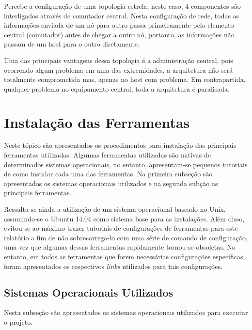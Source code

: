 		Percebe a configuração de uma topologia estrela, neste caso, 4 componentes são interligados através de comutador central. Nesta configuração de rede, todas as informações enviada de um nó para outro passa primeiramente pelo elemento central (comutador) antes de chegar a outro nó, portanto, as informações não passam de um host para o outro diretamente. \cite{Tanenbaum}

		Uma das principais vantagens dessa topologia é a administração central, pois ocorrendo algum problema em uma das extremidades, a arquitetura não será totalmente comprometida mas, apenas no host com problema. Em contrapartida, qualquer problema no equipamento central, toda a arquitetura é paralisada. 

	\section{Instalação das Ferramentas}
	\label{sec:Arquitetura_Componentes}

		Neste tópico são apresentados os procedimentos para instalação das principais ferramentas utilizadas. Algumas ferramentas utilizadas são nativas de determinados sistemas operacionais, no entanto, apresentam-se pequenos tutoriais de como instalar cada uma das ferramentas. Na primeira subseção são apresentados os sistemas operacionais utilizados e na segunda subção as principais ferramentas.

		Ressalta-se ainda a utilização de um sistema operacional baseado no Unix, assumindo-se o Ubuntu 14.04 como sistema base para as instalações. Além disso, evitou-se ao máximo trazer tutoriais de configurações de ferramentas para este relatório a fim de não sobrecarrega-lo com uma série de comando de configuração, uma vez que algumas dessas ferramentas rapidamente tornou-se obsoletas. No entanto, em todos as ferramentas que forem necessárias configurações específicas, foram apresentados os respectivos \emph{links} utilizados para tais configurações.

		\subsection{Sistemas Operacionais Utilizados}
		\label{sec:Arquitetura_Componentes_SOU}

			Nesta subseção são apresentados os sistemas operacionais utilizados para executar o projeto.

